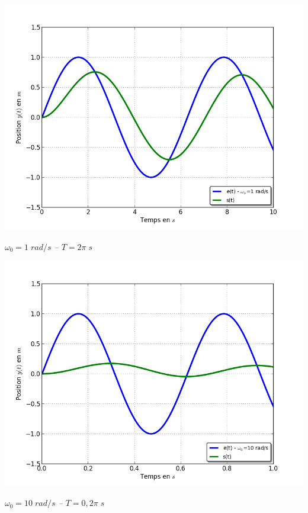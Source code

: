 \documentclass[10pt,oneside]{article}
\begin{document}
\begin{minipage}[c]{.24\linewidth}
\begin{center}
\includegraphics[width=\textwidth]{png/sinus_om1}

\textit{$\omega_0 =  1\; rad/s $ -- $ T = 2 \pi \; s$}
\end{center}
\end{minipage}\hfill
\begin{minipage}[c]{.24\linewidth}
\begin{center}
\includegraphics[width=\textwidth]{png/sinus_om10}

\textit{$\omega_0 =  10\; rad/s $ -- $ T = 0,2 \pi \; s$}
\end{center}
\end{minipage}
\end{document}
